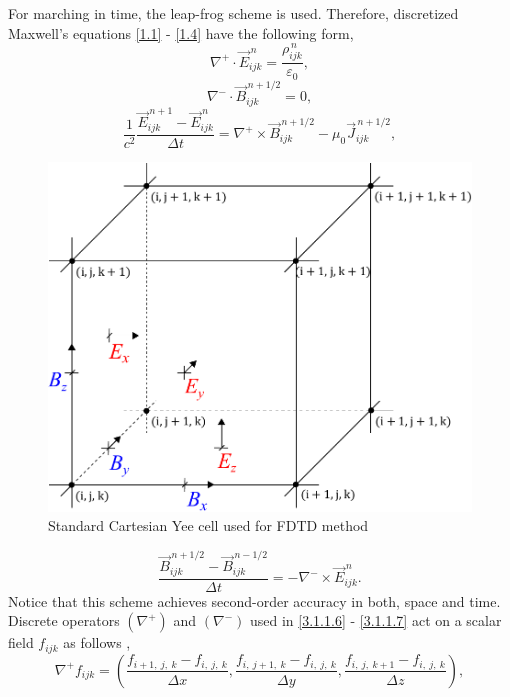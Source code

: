 For marching in time, the leap-frog scheme is used. Therefore, discretized Maxwell's equations \ref{1.1} - \ref{1.4} have the following form,
\begin{equation}
\label{3.1.1.6}
\nabla^{+} \cdot \vec{E}_{ijk}^{\,n} = \frac{\rho_{ijk}^{\,n}}{\varepsilon_0},
\end{equation}
\begin{equation}
\label{3.1.1.15}
\nabla^{-} \cdot \vec{B}_{ijk}^{\,n + 1/2} = 0,
\end{equation}
\begin{equation}
\label{3.1.1.16}
\frac{1}{c^{2}} \frac{\vec{E}_{ijk}^{\,n + 1} - \vec{E}_{ijk}^{\,n}}{\Delta t} = \nabla^{+} \times \vec{B}_{ijk}^{\,n + 1/2} - \mu_{0} \vec{J}_{ijk}^{\,n + 1/2},
\end{equation}
\begin{figure}[t]
	\centering
	\includegraphics[width=0.4\paperwidth]{./img/YEE/yee.pdf}
	\caption{Standard Cartesian Yee cell used for FDTD method}
	\label{3.1.1.14}
\end{figure}
\begin{equation}
\label{3.1.1.7}
\frac{\vec{B}_{ijk}^{\,n + 1/2} - \vec{B}_{ijk}^{\,n - 1/2}}{\Delta t} = -\nabla^{-} \times \vec{E}_{ijk}^{\,n}.
\end{equation}
Notice that this scheme achieves second-order accuracy in both, space and time. Discrete operators $ \left(\nabla^{+}\right) $ and $ \left(\nabla^{-}\right) $ used in \ref{3.1.1.6} - \ref{3.1.1.7} act on a scalar field $ f_{i j k} $ as follows \cite{esirkepov},
\begin{equation}
\label{3.1.1.8}
\nabla^{+} f_{i j k} = \left(\frac{f_{i + 1,\: j,\: k} - f_{i,\: j,\: k}}{\Delta x}, \frac{f_{i,\: j + 1,\: k} - f_{i,\: j,\: k}}{\Delta y}, \frac{f_{i,\: j,\: k + 1} - f_{i,\: j,\: k}}{\Delta z} \right), 
\end{equation}
